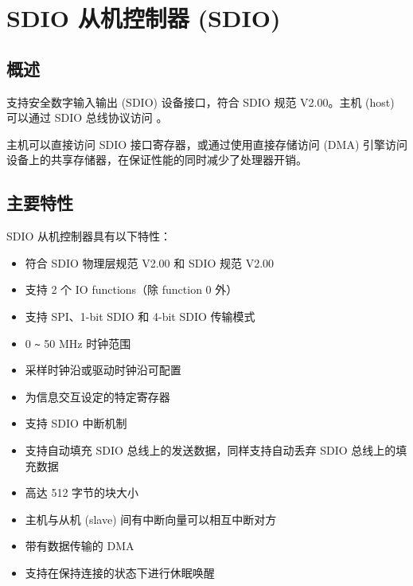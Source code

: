 \documentclass[main\_\_CN.tex]{subfiles}
\begin{document}

\ifglobal
\else
    {\let\clearpage\relax \listoftodos}
    {\let\clearpage\relax \listofdonetodos}
    \tableofcontents
\fi



\hypertarget{sdioslave}{}
\chapter{SDIO 从机控制器 (SDIO)}
\label{mod:sdioslave}



\section{概述}
\chipname{} 支持安全数字输入输出 (SDIO) 设备接口，符合 SDIO 规范 V2.00。主机 (host) 可以通过 SDIO 总线协议访问 \chipname{}。
     
主机可以直接访问 \chipname{} SDIO 接口寄存器，或通过使用直接存储访问 (DMA) 引擎访问设备上的共享存储器，在保证性能的同时减少了处理器开销。

\section{主要特性}
SDIO 从机控制器具有以下特性：

\begin{itemize}
    \item 符合 SDIO 物理层规范 V2.00 和 SDIO 规范 V2.00
    \item 支持 2 个 IO functions（除 function 0 外）
    \item 支持 SPI、1-bit SDIO 和 4-bit SDIO 传输模式
    \item 0 \verb+~+ 50 MHz 时钟范围
    \item 采样时钟沿或驱动时钟沿可配置
    \item 为信息交互设定的特定寄存器
    \item 支持 SDIO 中断机制
    \item 支持自动填充 SDIO 总线上的发送数据，同样支持自动丢弃 SDIO 总线上的填充数据
    \item 高达 512 字节的块大小
    \item 主机与从机 (slave) 间有中断向量可以相互中断对方
    \item 带有数据传输的 DMA
    \item 支持在保持连接的状态下进行休眠唤醒
\end{itemize}
\end{document}
